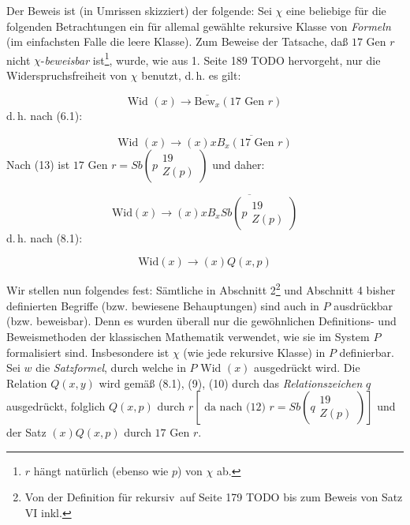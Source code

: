 \documentclass[draft]{scrartcl}
\let\oldleft\left
\let\oldright\right
\def\left#1{%
	    \global\advance\bracketnum1\relax 
		\colorlet{temp}{.}%
		    \csname bracketcolor\the\bracketnum\endcsname
			\oldleft#1%
			    \color{temp}%
	}
\def\right#1{%
	    \colorlet{temp}{.}%
		\csname bracketcolor\the\bracketnum\endcsname
		    \oldright#1%
			\global\advance\bracketnum-1\relax
			    \color{temp}%
	}
\def\left#1{#1}
\def\right#1{#1}
\begin{document}
Der Beweis ist (in Umrissen skizziert) der folgende: Sei $\chi$ eine beliebige für die folgenden Betrachtungen ein für allemal gewählte rekursive Klasse von \textit{Formeln} (im einfachsten Falle die leere Klasse).
Zum Beweise der Tatsache, daß $17\text{ Gen }r$ nicht $\chi$-\textit{beweisbar} ist\footnote{$r$ hängt natürlich (ebenso wie $p$) von $\chi$ ab.}, wurde, wie aus 1. Seite 189 TODO hervorgeht, nur die Widerspruchsfreiheit von $\chi$ benutzt, d.\,h. es gilt:

\begin{equation}
\text{Wid }\left(x\right) \longrightarrow \overline{\text{Bew}_x} \left(17\text{ Gen } r\right)
\end{equation}
d.\,h. nach (6.1):

\begin{equation*}
\text{Wid }\left(x\right) \longrightarrow \left(x\right)\overline{x B_x \left(17\text{ Gen } r\right)}
\end{equation*}
Nach (13) ist $17\text{ Gen } r = Sb\left(p\substack{19\\ Z\left(p\right)}\right)$ und daher:

\begin{equation*}
\text{Wid}\left(x\right) \longrightarrow\left(x\right)\overline{x B_x Sb\left(p\substack{19\\ Z\left(p\right)}\right)}
\end{equation*}
d.\,h. nach (8.1):

\begin{equation}
\text{Wid}\left(x\right) \longrightarrow \left(x\right) Q\left(x, p\right)
\end{equation}

Wir stellen nun folgendes fest: Sämtliche in Abschnitt 2\footnote{Von der Definition für \glqq rekursiv\grqq\ auf Seite 179 TODO bis zum Beweis von Satz VI inkl.}
und Abschnitt 4 bisher definierten Begriffe (bzw. bewiesene Behauptungen) sind auch in $P$ ausdrückbar (bzw. beweisbar). Denn es wurden überall nur die gewöhnlichen Definitions- und Beweismethoden der klassischen Mathematik verwendet, wie sie im System $P$ formalisiert sind. Insbesondere ist $\chi$ (wie jede rekursive Klasse) in $P$ definierbar. Sei $w$ die \textit{Satzformel}, durch welche in $P\text{ Wid } \left(x\right)$ ausgedrückt wird. Die Relation $Q\left(x, y\right)$ wird gemäß (8.1), (9), (10) durch das \textit{Relationszeichen} $q$ ausgedrückt, folglich $Q\left(x, p\right)$ durch $r \left[\text{ da nach (12) } r = Sb\left(q\substack{19\\ Z\left(p\right)}\right)\right]$ und der Satz $\left(x\right)Q\left(x, p\right)$ durch $17\text{ Gen } r$.
\end{document}
